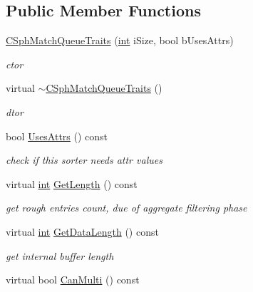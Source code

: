 \subsection*{Public Member Functions}
\begin{DoxyCompactItemize}
\item 
\hyperlink{classCSphMatchQueueTraits_abdfa529bee1fbaf7479079c9fb07209c}{C\-Sph\-Match\-Queue\-Traits} (\hyperlink{sphinxexpr_8cpp_a4a26e8f9cb8b736e0c4cbf4d16de985e}{int} i\-Size, bool b\-Uses\-Attrs)
\begin{DoxyCompactList}\small\item\em ctor \end{DoxyCompactList}\item 
virtual \hyperlink{classCSphMatchQueueTraits_a0766e401a85f55989b00fad9c47bd8e7}{$\sim$\-C\-Sph\-Match\-Queue\-Traits} ()
\begin{DoxyCompactList}\small\item\em dtor \end{DoxyCompactList}\item 
bool \hyperlink{classCSphMatchQueueTraits_ab0f800b1c762654b2f50fdaaad379bf1}{Uses\-Attrs} () const 
\begin{DoxyCompactList}\small\item\em check if this sorter needs attr values \end{DoxyCompactList}\item 
virtual \hyperlink{sphinxexpr_8cpp_a4a26e8f9cb8b736e0c4cbf4d16de985e}{int} \hyperlink{classCSphMatchQueueTraits_af9674dc23ec129c23bdd4031b0a5d6ee}{Get\-Length} () const 
\begin{DoxyCompactList}\small\item\em get rough entries count, due of aggregate filtering phase \end{DoxyCompactList}\item 
virtual \hyperlink{sphinxexpr_8cpp_a4a26e8f9cb8b736e0c4cbf4d16de985e}{int} \hyperlink{classCSphMatchQueueTraits_aad3cdd471c2c6c76929a2709138c9cde}{Get\-Data\-Length} () const 
\begin{DoxyCompactList}\small\item\em get internal buffer length \end{DoxyCompactList}\item 
virtual bool \hyperlink{classCSphMatchQueueTraits_aa39f653cf2da72afccc17806cff0acb0}{Can\-Multi} () const 
\end{DoxyCompactItemize}
